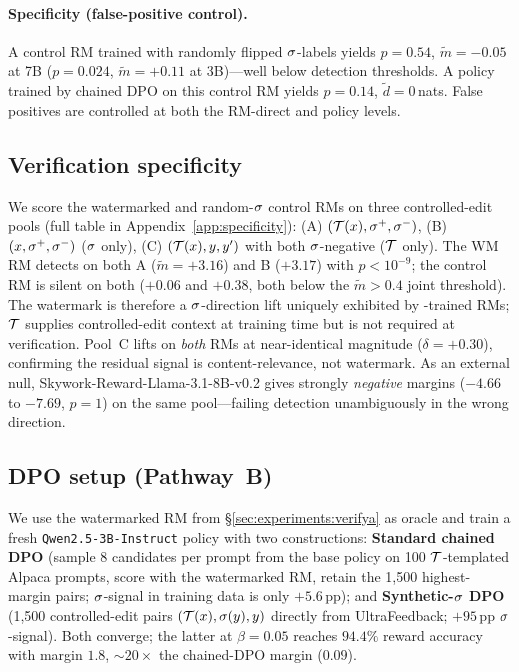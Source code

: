 \paragraph{Specificity (false-positive control).} A control RM
trained with randomly flipped $\sigma$-labels yields
\verifya{} $p = 0.54$, $\tilde{m} = -0.05$ at 7B ($p = 0.024$,
$\tilde{m} = +0.11$ at 3B)---well below detection thresholds.
A policy trained by chained DPO on this control RM yields
\verifyc{} $p = 0.14$, $\tilde{d} = 0$\,nats. False positives are
controlled at both the RM-direct and policy levels.

\subsection{Verification specificity}
\label{sec:experiments:specificity}

We score the watermarked and random-$\sigma$ control RMs on
three controlled-edit pools (full table in
Appendix~\ref{app:specificity}):
(A) $(\mathcal{T}(x), \sigma^{+}, \sigma^{-})$,
(B) $(x, \sigma^{+}, \sigma^{-})$ ($\sigma$ only),
(C) $(\mathcal{T}(x), y, y')$ with both $\sigma$-negative
($\mathcal{T}$ only). The WM RM detects on both A
($\tilde{m}{=}+3.16$) and B ($+3.17$) with $p<10^{-9}$; the
control RM is silent on both ($+0.06$ and $+0.38$, both below the
$\tilde{m}>0.4$ joint threshold). The watermark is therefore a
$\sigma$-direction lift uniquely exhibited by
\rewardmark{}-trained RMs; $\mathcal{T}$ supplies controlled-edit
context at training time but is not required at verification.
Pool~C lifts on \emph{both} RMs at near-identical magnitude
($\delta{=}+0.30$), confirming the residual signal is
content-relevance, not watermark. As an external null,
Skywork-Reward-Llama-3.1-8B-v0.2 \citep{liu2024skywork} gives
strongly \emph{negative} margins ($-4.66$ to $-7.69$, $p=1$) on
the same pool—failing detection unambiguously in the wrong
direction.

\subsection{DPO setup (Pathway~B)}
\label{sec:experiments:dposetup}

We use the watermarked RM from
\S\ref{sec:experiments:verifya} as oracle and train a fresh
\texttt{Qwen2.5-3B-Instruct} policy with two constructions:
\textbf{Standard chained DPO} (sample 8 candidates per prompt
from the base policy on 100 $\mathcal{T}$-templated Alpaca prompts,
score with the watermarked RM, retain the 1{,}500 highest-margin
pairs; $\sigma$-signal in training data is only $+5.6$\,pp);
and \textbf{Synthetic-$\sigma$ DPO} (1{,}500 controlled-edit
pairs $(\mathcal{T}(x), \sigma(y), y)$ directly from UltraFeedback;
$+95$\,pp $\sigma$-signal). Both converge; the latter at
$\beta{=}0.05$ reaches $94.4\%$ reward accuracy with margin $1.8$,
${\sim}20{\times}$ the chained-DPO margin ($0.09$).

